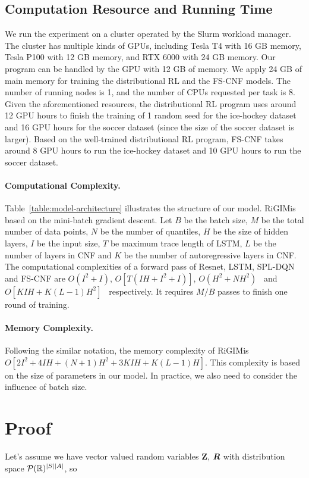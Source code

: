 \documentclass{article}
\newcommand{\state}{s}
\newcommand{\action}{a}
\newcommand{\reward}{r}
\newcommand{\sys}{RiGIM}
\newcommand{\system}{\sys\;}
\begin{document}
\subsection{Computation Resource and Running Time}
We run the experiment on a cluster operated by the Slurm workload manager. The cluster has multiple kinds of GPUs, including Tesla T4 with 16 GB memory, Tesla P100 with 12 GB memory, and RTX 6000 with 24 GB memory. 
Our program can be handled by the GPU with 12 GB of memory. We apply 24 GB of main memory for training the distributional RL and the FS-CNF models. The number of running nodes is 1, and the number of CPUs requested per task is 8. Given the aforementioned resources, the distributional RL program uses around 12 GPU hours to finish the training of 1 random seed for the ice-hockey dataset and 16 GPU hours for the soccer dataset (since the size of the soccer dataset is larger). 
Based on the well-trained distributional RL program, FS-CNF takes around 8 GPU hours 
to run the ice-hockey dataset and 10 GPU hours to run the soccer dataset. 

\paragraph{Computational Complexity.} Table~\ref{table:model-architecture} illustrates the structure of our model. \system is based on the mini-batch gradient descent. Let $B$ be the batch size, $M$ be the total number of data points, $N$ be the number of quantiles, $H$ be the size of hidden layers, $I$ be the input size, $T$ be maximum trace length of LSTM, $L$ be the number of layers in CNF and $K$ be the number of autoregressive layers in CNF.
The computational complexities of a forward pass of Resnet, LSTM, SPL-DQN and FS-CNF are $O(I^2+I)$, $O[T(IH+ I^2+I)]$, $O(H^2+NH^2)$~\cite{luo2022distributional} and $O[KIH+K(L-1)H^2]$~\cite{Papamakarios2017MAF} respectively. It requires $M/B$ passes to finish one round of training.
\paragraph{Memory Complexity.} Following the similar notation, the memory complexity of \system is $O[2I^{2}+4IH+(N+1)H^2+3KIH+K(L-1)H]$. This complexity is based on the size of parameters in our model. In practice, we also need to consider the influence of batch size.


\section{Proof}
Let's assume we have vector valued random variables $\boldsymbol{Z}$, $\boldsymbol{\MakeUppercase{\reward}}$ with distribution space $ \mathcal{P}(\mathbb{R})^{|\MakeUppercase{\state}||\MakeUppercase{\action}|}$, so
\end{document}
